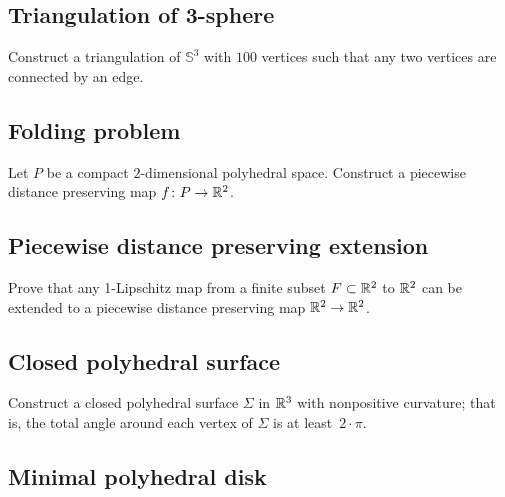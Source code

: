 \subsection*{Triangulation of 3-sphere}\label{4-poly}

\begin{pr}
Construct a triangulation of $\mathbb{S}^3$ 
with $100$ vertices
such that any two vertices are connected by an edge.
\end{pr}

\subsection*{Folding problem}\label{Folding problem}

\begin{pr}
Let $P$ be a compact $2$-dimensional 
polyhedral space. 
Construct a 
piecewise distance preserving map
$f\colon P\to \mathbb{R}^2$.
\end{pr}

\subsection*{Piecewise distance preserving extension}\label{iso-kirzhbraun}

\begin{pr}
Prove that any 1-Lipschitz map from a finite subset $F\subset \mathbb{R}^2$
to 
$\mathbb{R}^2$ can be extended to a 
piecewise distance preserving map
$\mathbb{R}^2\to\mathbb{R}^2$.
\end{pr}

\subsection*{Closed polyhedral surface}\label{Closed polyhedral surface}

\begin{pr}
Construct a closed polyhedral surface $\Sigma$ in $\mathbb{R}^3$ with nonpositive curvature;
that is, the total angle around each vertex of $\Sigma$ is at least~$2\cdot\pi$.
\end{pr}

\subsection*{Minimal polyhedral disk}\label{Minimal polyhedral disk}


